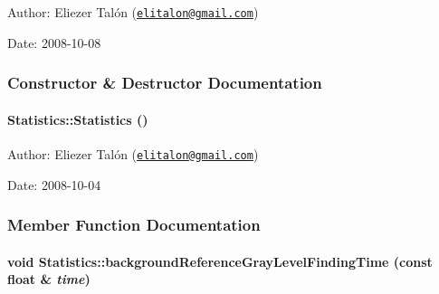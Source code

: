 \begin{Desc}
\item[Author:]Eliezer Talón (\href{mailto:elitalon@gmail.com}{\tt elitalon@gmail.com}) \end{Desc}
\begin{Desc}
\item[Date:]2008-10-08 \end{Desc}


\subsubsection{Constructor \& Destructor Documentation}
\hypertarget{class_statistics_60ddd90a571ed4c3ce8c0f6317a36d63}{
\paragraph[{Statistics}]{\setlength{\rightskip}{0pt plus 5cm}Statistics::Statistics ()}\hfill}
\label{class_statistics_60ddd90a571ed4c3ce8c0f6317a36d63}


\begin{Desc}
\item[Author:]Eliezer Talón (\href{mailto:elitalon@gmail.com}{\tt elitalon@gmail.com}) \end{Desc}
\begin{Desc}
\item[Date:]2008-10-04 \end{Desc}


\subsubsection{Member Function Documentation}
\hypertarget{class_statistics_5c9fede192f06bc757d18336dfcf84cf}{
\paragraph[{backgroundReferenceGrayLevelFindingTime}]{\setlength{\rightskip}{0pt plus 5cm}void Statistics::backgroundReferenceGrayLevelFindingTime (const float \& {\em time})}\hfill}
\label{class_statistics_5c9fede192f06bc757d18336dfcf84cf}


